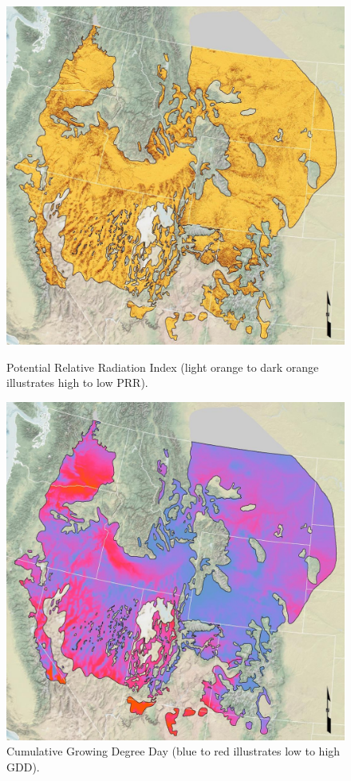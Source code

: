 \def\year{2017}\relax \documentclass[letterpaper]{article}
\begin{document}
\begin{figure}
\centering
\begin{minipage}{.48\textwidth}
  \centering
  \includegraphics[width=\textwidth]{pics/prr.png}
 \caption{Potential Relative Radiation Index (light orange to dark orange illustrates high to low PRR).}\label{fig:prr}
\end{minipage}
\begin{minipage}{.04\textwidth}
\end{minipage}
\begin{minipage}{.48\textwidth}
  \centering
  \includegraphics[width=\textwidth]{pics/gdd.png}
\caption{Cumulative Growing Degree Day (blue to red illustrates low to high GDD).}\label{fig:gdd}
\end{minipage}
\end{figure}
\end{document}
